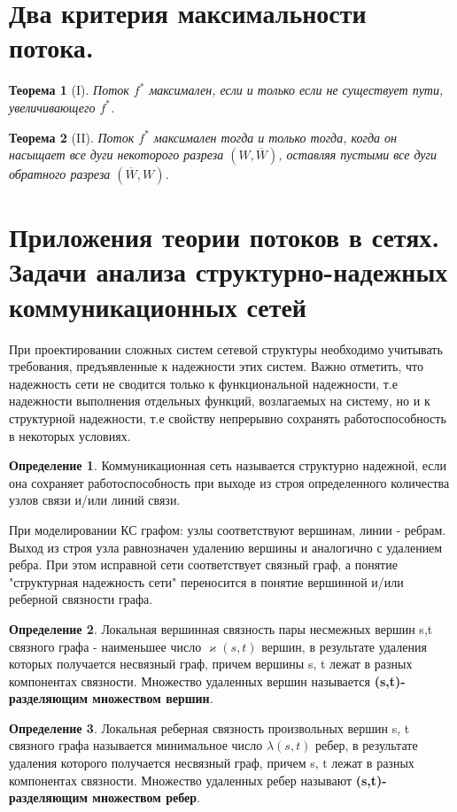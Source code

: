 \documentclass[a4paper]{article}
\newtheorem{theorem}{Теорема}[section]
\theoremstyle{definition}
\newtheorem*{definition}{Определение}
\theoremstyle{remark}
\begin{document}
\begin{multicols*}{2}
    \section{Два критерия максимальности потока.}
    \begin{theorem}[I]
        Поток $f^*$ максимален, если и только если не существует пути, увеличивающего $f^*$.
    \end{theorem}
    \begin{theorem}[II]
        Поток $f^*$ максимален тогда и только тогда, когда он насыщает все дуги некоторого разреза $(W, \overline{W})$, оставляя пустыми все дуги обратного разреза $(\overline{W}, W)$.
    \end{theorem}
    \section{Приложения теории потоков в сетях. Задачи анализа структурно-надежных 
    коммуникационных сетей}
    При проектировании сложных систем сетевой структуры необходимо учитывать требования, предъявленные к надежности этих систем. Важно отметить, что надежность сети не сводится только к функциональной надежности, т.е надежности выполнения отдельных функций, возлагаемых на систему, но и к структурной надежности, т.е свойству непрерывно сохранять работоспособность в некоторых условиях.
    \begin{definition}
        Коммуникационная сеть называется структурно надежной, если она сохраняет работоспособность при выходе из строя определенного количества узлов связи и/или линий связи.
    \end{definition}
    При моделировании КС графом: узлы соответствуют вершинам, линии - ребрам. Выход из строя узла равнозначен удалению вершины и аналогично с удалением ребра. При этом исправной сети соответствует связный граф, а понятие "структурная надежность сети" переносится в понятие вершинной и/или реберной связности графа.
    \begin{definition}
        Локальная вершинная связность пары несмежных вершин s,t связного графа - наименьшее число $\varkappa(s, t)$ вершин, в результате удаления которых получается несвязный граф, причем вершины s, t лежат в разных компонентах связности. Множество удаленных вершин называется \textbf{(s,t)-разделяющим множеством вершин}.
    \end{definition} 
    \begin{definition}
        Локальная реберная связность произвольных вершин s, t связного графа называется минимальное число $\lambda(s, t)$ ребер, в результате удаления которого получается несвязный граф, причем s, t лежат в разных компонентах связности. Множество удаленных ребер называют \textbf{(s,t)-разделяющим множеством ребер}.

\end{definition}
\end{multicols*}
\end{document}
